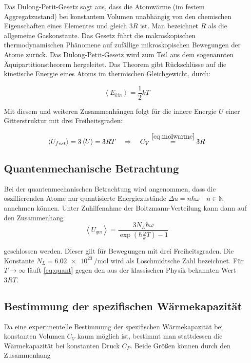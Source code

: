 Das Dulong-Petit-Gesetz sagt aus, dass die Atomwärme (im festem Aggregatzustand) bei %
konstantem Volumen unabhängig von den chemischen Eigenschaften eines Elementes
und gleich $3R$ ist. %
Man bezeichnet $R$ als die allgemeine Gaskonstante. %
Das Gesetz führt die makroskopischen thermodynamischen Phänomene
auf zufällige mikroskopischen Bewegungen der Atome zurück. %
Das Dulong-Petit-Gesetz wird zum Teil aus dem %
sogenannten Äquipartitionstheorem hergeleitet.
Das Theorem gibt Rückschlüsse auf die kinetische Energie eines Atoms %
im thermischen Gleichgewicht, durch:

\begin{equation*}
\left< E_{kin} \right>=\frac{1}{2}kT
\end{equation*}

Mit diesem und weiteren Zusammenhängen folgt für die innere Energie $U$ %
einer Gitterstruktur mit drei Freiheitsgraden:

\begin{equation*}
\left< U_{fest} \right> = 3 \left< U \right>=3RT \quad \Rightarrow \quad C_{V}\overset{\eqref{eq:molwarme}}{=}3R
\end{equation*}

\subsection{Quantenmechanische Betrachtung}
Bei der quantenmechanischen Betrachtung wird angenommen,
dass die oszillierenden Atome nur quantisierte Energiezustände $\Delta u=n\hbar \omega \quad n\in\mathbb{N}$
annehmen können.
Unter Zuhilfenahme der Boltzmann-Verteilung kann dann auf den Zusammenhang  %
\begin{equation}
\label{eq:quant}
\left< U_{qm} \right> =\frac{3N_L \hbar \omega}{\exp\left(\hbar \frac{\omega}{k} T\right) -1}
\end{equation}

geschlossen werden. Dieser gilt für Bewegungen mit drei Freiheitsgraden.
Die Konstante $N_L = \SI{6.02e23}{\per\mol}$ wird als Loschmidtsche Zahl bezeichnet.
Für $T\to\infty$ läuft \eqref{eq:quant} gegen den aus der klassischen Physik bekannten Wert %
$3RT$.

\subsection{Bestimmung der spezifischen Wärmekapazität}
Da eine experimentelle Bestimmung der spezifischen Wärmekapazität
bei konstanten Volumen $C_V$ kaum möglich ist, %
bestimmt man stattdessen die Wärmekapazität bei konstanten Druck $C_P$. %
Beide Größen können durch den Zusammenhang %

